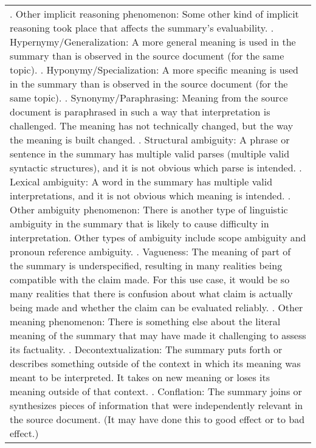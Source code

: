 \begin{table*}
\begin{tabular}{@{}p{14cm}@{}}
    \newline
    4. Other implicit reasoning phenomenon: Some other kind of implicit reasoning took place that affects the summary's evaluability.
    \newline
    5. Hypernymy/Generalization: A more general meaning is used in the summary than is observed in the source document (for the same topic).
    \newline
    6. Hyponymy/Specialization: A more specific meaning is used in the summary than is observed in the source document (for the same topic).
    \newline
    7. Synonymy/Paraphrasing: Meaning from the source document is paraphrased in such a way that interpretation is challenged. The meaning has not technically changed, but the way the meaning is built changed.
    \newline
    8. Structural ambiguity: A phrase or sentence in the summary has multiple valid parses (multiple valid syntactic structures), and it is not obvious which parse is intended.
    \newline
    9. Lexical ambiguity: A word in the summary has multiple valid interpretations, and it is not obvious which meaning is intended.
    \newline
    10. Other ambiguity phenomenon: There is another type of linguistic ambiguity in the summary that is likely to cause difficulty in interpretation. Other types of ambiguity include scope ambiguity and pronoun reference ambiguity.
    \newline
    11. Vagueness: The meaning of part of the summary is underspecified, resulting in many realities being compatible with the claim made. For this use case, it would be so many realities that there is confusion about what claim is actually being made and whether the claim can be evaluated reliably.
    \newline
    12. Other meaning phenomenon: There is something else about the literal meaning of the summary that may have made it challenging to assess its factuality.
    \newline
    13. Decontextualization: The summary puts forth or describes something outside of the context in which its meaning was meant to be interpreted. It takes on new meaning or loses its meaning outside of that context.
    \newline
    14. Conflation: The summary joins or synthesizes pieces of information that were independently relevant in the source document. (It may have done this to good effect or to bad effect.)

\end{tabular}
\end{table*}
